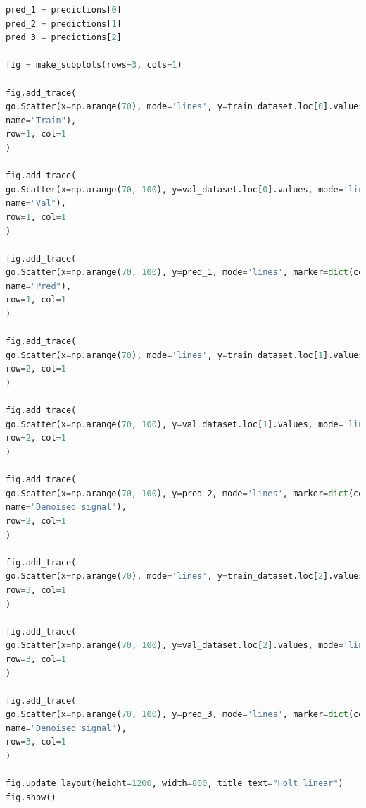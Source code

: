 \documentclass{article}
\begin{document}
\begin{latin}
\begin{lstlisting}[language=Python]
pred_1 = predictions[0]
pred_2 = predictions[1]
pred_3 = predictions[2]

fig = make_subplots(rows=3, cols=1)

fig.add_trace(
go.Scatter(x=np.arange(70), mode='lines', y=train_dataset.loc[0].values, marker=dict(color="dodgerblue"),
name="Train"),
row=1, col=1
)

fig.add_trace(
go.Scatter(x=np.arange(70, 100), y=val_dataset.loc[0].values, mode='lines', marker=dict(color="darkorange"),
name="Val"),
row=1, col=1
)

fig.add_trace(
go.Scatter(x=np.arange(70, 100), y=pred_1, mode='lines', marker=dict(color="seagreen"),
name="Pred"),
row=1, col=1
)

fig.add_trace(
go.Scatter(x=np.arange(70), mode='lines', y=train_dataset.loc[1].values, marker=dict(color="dodgerblue"), showlegend=False),
row=2, col=1
)

fig.add_trace(
go.Scatter(x=np.arange(70, 100), y=val_dataset.loc[1].values, mode='lines', marker=dict(color="darkorange"), showlegend=False),
row=2, col=1
)

fig.add_trace(
go.Scatter(x=np.arange(70, 100), y=pred_2, mode='lines', marker=dict(color="seagreen"), showlegend=False,
name="Denoised signal"),
row=2, col=1
)

fig.add_trace(
go.Scatter(x=np.arange(70), mode='lines', y=train_dataset.loc[2].values, marker=dict(color="dodgerblue"), showlegend=False),
row=3, col=1
)

fig.add_trace(
go.Scatter(x=np.arange(70, 100), y=val_dataset.loc[2].values, mode='lines', marker=dict(color="darkorange"), showlegend=False),
row=3, col=1
)

fig.add_trace(
go.Scatter(x=np.arange(70, 100), y=pred_3, mode='lines', marker=dict(color="seagreen"), showlegend=False,
name="Denoised signal"),
row=3, col=1
)

fig.update_layout(height=1200, width=800, title_text="Holt linear")
fig.show()
\end{lstlisting}
\end{latin}
\pagebreak
\end{document}
